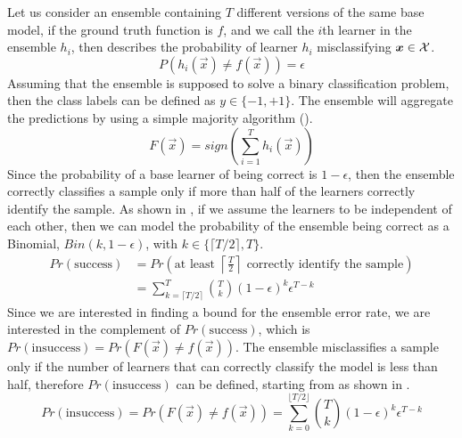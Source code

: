 Let us consider an ensemble containing $T$ different versions of the same base model, if the ground
truth function is $f$, and we call the $i$th learner in the ensemble $h_i$, then 
describes the probability of learner $h_i$ misclassifying $\boldsymbol{x} \in \mathcal{X}$.
\begin{equation}
	\label{eq:error-rate}
	P(h_i(\vec{x}) \neq f(\vec{x})) = \epsilon
\end{equation}
Assuming that the ensemble is supposed to solve a binary classification problem, then the class
labels can be defined as $y \in \{-1, +1\}$. The ensemble will aggregate the predictions by using a simple majority algorithm ().
\begin{equation}
	\label{eq:ensemble-aggregation}
	F(\vec{x}) = sign\left(\sum_{i = 1}^{T}h_i(\vec{x})\right)
\end{equation}
Since the probability of a base learner of being correct is $1 - \epsilon$, then the ensemble
correctly classifies a sample only if more than half of the learners correctly identify the sample.
As shown in , if we assume the learners to be independent of each other,
then we can model the probability of the ensemble being correct as a Binomial, $Bin(k, 1 -
\epsilon)$, with $k \in \{\lceil{T / 2}\rceil, T\}$.
\begin{equation}
	\label{eq:succ-probability}
	\begin{aligned}
		Pr(\text{success}) & = Pr\left(\text{at least } \left\lceil{\frac{T}{2}}\right\rceil \text{ correctly identify
		the sample}\right)
		\\
			   & = \sum_{k = \lceil{T / 2}\rceil}^T \binom{T}{k} (1 - \epsilon)^k
			   \epsilon^{T - k}
	\end{aligned}
\end{equation}
Since we are interested in finding a bound for the ensemble error rate, we are interested in the
complement of $Pr(\text{success})$, which is $Pr(\text{insuccess}) = Pr(F(\vec{x}) \neq
f(\vec{x}))$. The ensemble misclassifies a sample only if the number of learners that can correctly classify the model is less than half, therefore $Pr(\text{insuccess})$ can be defined, starting from  as shown in .
\begin{equation}
	\label{eq:insucc-probability}
	Pr(\text{insuccess}) = Pr(F(\vec{x}) \neq f(\vec{x})) = \sum_{k = 0}^{\lfloor{T / 2}\rfloor} \binom{T}{k} (1 - \epsilon)^k \epsilon^{T - k}
\end{equation}
